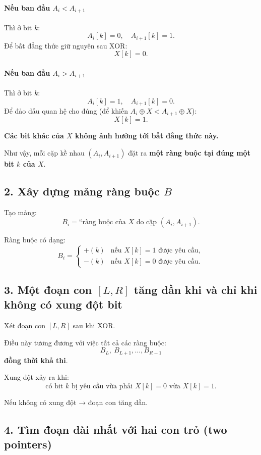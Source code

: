 \paragraph{Nếu ban đầu $A_i < A_{i+1}$}  
Thì ở bit $k$:
\[
A_i[k] = 0,\quad A_{i+1}[k] = 1.
\]
Để bất đẳng thức giữ nguyên sau XOR:
\[
X[k] = 0.
\]

\paragraph{Nếu ban đầu $A_i > A_{i+1}$}  
Thì ở bit $k$:
\[
A_i[k] = 1,\quad A_{i+1}[k] = 0.
\]
Để đảo dấu quan hệ cho đúng (để khiến $A_i \oplus X < A_{i+1} \oplus X$):
\[
X[k] = 1.
\]

\textbf{Các bit khác của $X$ không ảnh hưởng tới bất đẳng thức này.}

Như vậy, mỗi cặp kề nhau $(A_i, A_{i+1})$ đặt ra \textbf{một ràng buộc tại đúng một bit $k$ của $X$}.

\subsection*{2. Xây dựng mảng ràng buộc $B$}

Tạo mảng:
\[
B_i = \text{“ràng buộc của $X$ do cặp } (A_i, A_{i+1}).
\]

Ràng buộc có dạng:
\[
B_i = 
\begin{cases}
+(k) & \text{nếu } X[k] = 1 \text{ được yêu cầu},\\
-(k) & \text{nếu } X[k] = 0 \text{ được yêu cầu}.
\end{cases}
\]

\subsection*{3. Một đoạn con $[L, R]$ tăng dần khi và chỉ khi không có xung đột bit}

Xét đoạn con $[L, R]$ sau khi XOR.

Điều này tương đương với việc tất cả các ràng buộc:
\[
B_L,\ B_{L+1}, \ldots, B_{R-1}
\]
\textbf{đồng thời khả thi}.

Xung đột xảy ra khi:
\[
\text{có bit } k \text{ bị yêu cầu vừa phải } X[k]=0 \text{ vừa } X[k]=1.
\]

Nếu không có xung đột → đoạn con tăng dần.

\subsection*{4. Tìm đoạn dài nhất với hai con trỏ (two pointers)}

